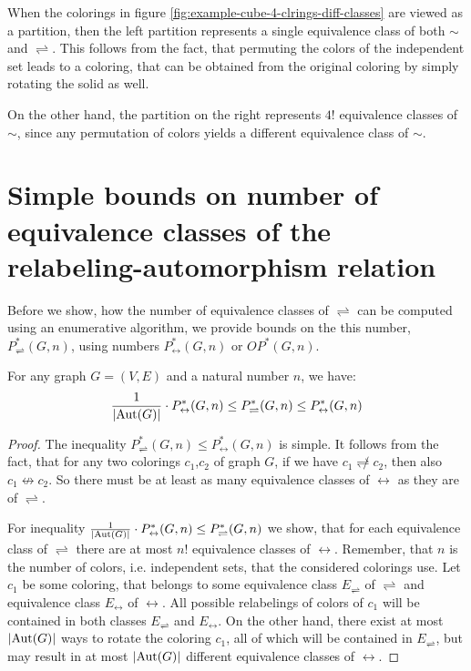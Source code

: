 When the colorings in figure \ref{fig:example-cube-4-clrings-diff-classes} are viewed as a partition, then the left partition represents a single equivalence class of both $\sim$ and $\rightleftharpoons$. This follows from the fact, that permuting the colors of the independent set leads to a coloring, that can be obtained from the original coloring by simply rotating the solid as well.

On the other hand, the partition on the right represents $4!$ equivalence classes of $\sim$, since any permutation of colors yields a different equivalence class of $\sim$.

\section{Simple bounds on number of equivalence classes of the relabeling-automorphism relation}

Before we show, how the number of equivalence classes of $\rightleftharpoons$ can be computed using an enumerative algorithm, we provide bounds on the this number, $P^*_\rightleftharpoons(G,n)$, using numbers $P^*_\leftrightarrow(G,n)$ or $OP^*(G,n)$.

\begin{claim}\label{clm:relabeling-bound}
    For any graph $G=(V,E)$ and a natural number $n$, we have: $$\frac{1}{\left|{\operatorname{Aut}(G)}\right|} \cdot P^*_\leftrightarrow(G,n) \leq P^*_\rightleftharpoons(G,n) \leq P^*_\leftrightarrow(G,n)$$ 
\end{claim}

\begin{proof}

The inequality $P^*_\rightleftharpoons(G,n) \leq P^*_\leftrightarrow(G,n)$ is simple. It follows from the fact, that for any two colorings $c_1$,$c_2$ of graph $G$, if we have $c_1 \not\rightleftharpoons c_2$, then also $c_1 \not\leftrightarrow c_2$. So there must be at least as many equivalence classes of $\leftrightarrow$ as they are of $\rightleftharpoons$.

For inequality $\frac{1}{\left|{\operatorname{Aut}(G)}\right|} \cdot P^*_\leftrightarrow(G,n) \leq P^*_\rightleftharpoons(G,n)$ we show, that for each equivalence class of $\rightleftharpoons$ there are at most $n!$ equivalence classes of $\leftrightarrow$. Remember, that $n$ is the number of colors, i.e. independent sets, that the considered colorings use. Let $c_1$ be some coloring, that belongs to some equivalence class $E_\rightleftharpoons$ of $\rightleftharpoons$ and equivalence class $E_\leftrightarrow$ of $\leftrightarrow$. All possible relabelings of colors of $c_1$ will be contained in both classes $E_\rightleftharpoons$ and $E_\leftrightarrow$. On the other hand, there exist at most $\left|{\operatorname{Aut}(G)}\right|$ ways to rotate the coloring $c_1$, all of which will be contained in $E_\rightleftharpoons$, but may result in at most $\left|{\operatorname{Aut}(G)}\right|$ different equivalence classes of $\leftrightarrow$.

\end{proof}

